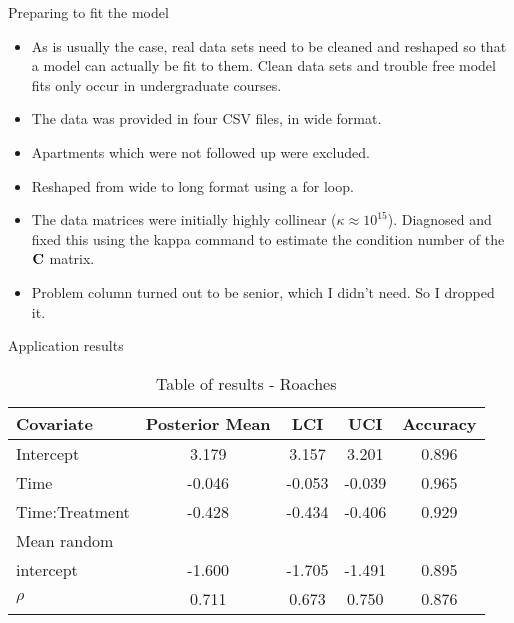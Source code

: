 \documentclass{beamer}
\begin{document}
\begin{frame}{Preparing to fit the model}
\begin{itemize}
\item As is usually the case, real data sets need to be cleaned and reshaped so that a model can
actually be fit to them. Clean data sets and trouble free model fits only occur in undergraduate
courses.
\item The data was provided in four CSV files, in wide format.
\item Apartments which were not followed up were excluded.
\item Reshaped from wide to long format using a for loop.
\item The data matrices were initially highly collinear ($\kappa \approx 10^{15}$). Diagnosed and fixed this
using the kappa command to estimate the condition number of the ${\bf C}$ matrix.
\item Problem column turned out to be senior, which I didn't need. So I dropped it.
\end{itemize}
\end{frame}

\begin{frame}{Application results}
\begin{table}
\label{tab:application_roaches}
\caption{Table of results - Roaches}
\begin{tabular}{|l|cccc|}
\hline
Covariate & Posterior Mean & LCI &  UCI & Accuracy \\
\hline
Intercept & 3.179 & 3.157 & 3.201 & 0.896 \\
Time & -0.046 & -0.053 & -0.039 & 0.965 \\
Time:Treatment & -0.428 & -0.434 & -0.406 & 0.929 \\
Mean random\\  intercept & -1.600 & -1.705 & -1.491 & 0.895 \\
$\rho$ & 0.711 & 0.673 & 0.750 & 0.876 \\
\hline
\end{tabular}
\end{table}
\end{frame}
\end{document}
